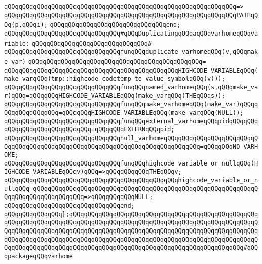 \verb|qQQqqQQqqQQqqQQqqQQqqQQqqQQqqQQqqQQqqQQqqQQqqQQqqQQqqQQqqQQqqQQq=>|\newline
\verb|qQQqqQQqqQQqqQQqqQQqqQQqqQQqqQQqqQQqqQQqqQQqqQQqqQQqqQQqqQQqqQQqPATHqQQq(p,qQQqi);|\newline
\verb|qQQqqQQqqQQqqQQqqQQqqQQqqQQqqQQqend;|\newline
\newline
\newline
\verb|qQQqqQQqqQQqqQQqqQQqqQQqqQQqqQQq#qQQqDuplicatingqQQqaqQQqvarhomeqQQqvariable:|\newline
\verb|qQQqqQQqqQQqqQQqqQQqqQQqqQQqqQQq#|\newline
\verb|qQQqqQQqqQQqqQQqqQQqqQQqqQQqqQQqfunqQQqduplicate_varhomeqQQq(v,qQQqmake_var)|\newline
\verb|qQQqqQQqqQQqqQQqqQQqqQQqqQQqqQQqqQQqqQQqqQQqqQQq=|\newline
\verb|qQQqqQQqqQQqqQQqqQQqqQQqqQQqqQQqqQQqqQQqqQQqqQQqHIGHCODE_VARIABLEqQQq(make_varqQQq(tmp::highcode_codetemp_to_value_symbolqQQq(v)));|\newline
\newline
\newline
\verb|qQQqqQQqqQQqqQQqqQQqqQQqqQQqqQQqfunqQQqnamed_varhomeqQQq(s,qQQqmake_var)qQQq=qQQqqQQqHIGHCODE_VARIABLEqQQq(make_varqQQq(THEqQQqs));|\newline
\verb|qQQqqQQqqQQqqQQqqQQqqQQqqQQqqQQqfunqQQqmake_varhomeqQQq(make_var)qQQqqQQqqQQqqQQqqQQq=qQQqqQQqHIGHCODE_VARIABLEqQQq(make_varqQQq(NULL));|\newline
\verb|qQQqqQQqqQQqqQQqqQQqqQQqqQQqqQQqfunqQQqexternal_varhomeqQQqpidqQQqqQQqqQQqqQQqqQQqqQQqqQQqqQQq=qQQqqQQqEXTERNqQQqpid;|\newline
\verb|qQQqqQQqqQQqqQQqqQQqqQQqqQQqqQQqnull_varhomeqQQqqQQqqQQqqQQqqQQqqQQqqQQqqQQqqQQqqQQqqQQqqQQqqQQqqQQqqQQqqQQqqQQqqQQqqQQqqQQq=qQQqqQQqNO_VARHOME;|\newline
\newline
\newline
\verb|qQQqqQQqqQQqqQQqqQQqqQQqqQQqqQQqfunqQQqhighcode_variable_or_nullqQQq(HIGHCODE_VARIABLEqQQqv)qQQq=>qQQqqQQqqQQqTHEqQQqv;|\newline
\verb|qQQqqQQqqQQqqQQqqQQqqQQqqQQqqQQqqQQqqQQqqQQqqQQqhighcode_variable_or_nullqQQq_qQQqqQQqqQQqqQQqqQQqqQQqqQQqqQQqqQQqqQQqqQQqqQQqqQQqqQQqqQQqqQQqqQQqqQQqqQQqqQQqqQQq=>qQQqqQQqqQQqNULL;|\newline
\verb|qQQqqQQqqQQqqQQqqQQqqQQqqQQqqQQqend;|\newline
\verb|qQQqqQQqqQQqqQQq};qQQqqQQqqQQqqQQqqQQqqQQqqQQqqQQqqQQqqQQqqQQqqQQqqQQqqQQqqQQqqQQqqQQqqQQqqQQqqQQqqQQqqQQqqQQqqQQqqQQqqQQqqQQqqQQqqQQqqQQqqQQqqQQqqQQqqQQqqQQqqQQqqQQqqQQqqQQqqQQqqQQqqQQqqQQqqQQqqQQqqQQqqQQqqQQqqQQqqQQqqQQqqQQqqQQqqQQqqQQqqQQqqQQqqQQqqQQqqQQqqQQqqQQqqQQqqQQqqQQqqQQqqQQqqQQqqQQqqQQqqQQqqQQqqQQqqQQqqQQqqQQqqQQqqQQqqQQqqQQqqQQqqQQq#qQQqpackageqQQqvarhome|\newline
